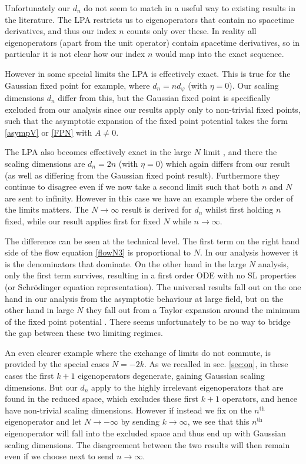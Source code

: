 \documentclass[11pt,a4paper]{article}
\numberwithin{figure}{section}
\numberwithin{equation}{section}
\newcommand{\ph}{\varphi}
\begin{document}
Unfortunately our $d_n$ do not seem to match in a useful way to existing results in the literature. The LPA restricts us to eigenoperators that contain no spacetime derivatives, and thus our index $n$ counts only over these. In reality all eigenoperators (apart from the unit operator) contain spacetime derivatives, so in particular it is not clear how our index $n$ would map into the exact sequence.

However in some special limits the LPA is effectively exact. This is true for the Gaussian fixed point for example, where $d_n = nd_\ph$ (with $\eta=0$). Our scaling dimensions $d_n$ differ from this, but the Gaussian fixed point is specifically excluded from our analysis since our results apply only to non-trivial fixed points, such that the asymptotic expansion of the fixed point potential takes the form \eqref{asympV} or \eqref{FPN} with $A\ne0$. 

The LPA also becomes effectively exact in the large $N$ limit \cite{DAttanasio:1997he}, and there the scaling dimensions are $d_n=2n$ (with $\eta=0$) which again differs from our result (as well as differing from the Gaussian fixed point result). Furthermore they continue to disagree even if we now take a second limit such that both $n$ and $N$ are sent to infinity. However in this case we have an example where the order of the limits matters. The $N\to\infty$ result is derived for $d_n$ whilst first holding $n$ fixed, while our result applies first for fixed $N$ while $n\to\infty$. 

The difference can be seen at the technical level. The first term on the right hand side of the flow equation \eqref{flowN3} is proportional to $N$. In our analysis however it is the denominators that dominate. On the other hand in the large $N$ analysis, only the first term survives, resulting in a first order ODE with no SL properties (or Schr\"odinger equation representation). The universal results fall out on the one hand in our analysis from the asymptotic behaviour at large field, but on the other hand in large $N$ they fall out from a Taylor expansion around the minimum of the fixed point potential \cite{DAttanasio:1997he}. There seems unfortunately to be no way to bridge the gap between these two limiting regimes.

An even clearer example where the exchange of limits do not commute, is provided by the special cases $N=-2k$. As we recalled in sec. \ref{sec:on}, in these cases the first $k+1$ eigenoperators degenerate, gaining Gaussian scaling dimensions. But our $d_n$ apply to the highly irrelevant eigenoperators that are found in the reduced space, which excludes these first $k+1$ operators, and hence have non-trivial scaling dimensions. However if instead we fix on the $n^\text{th}$ eigenoperator and let $N\to-\infty$ by sending $k\to\infty$, we see that this $n^\text{th}$ eigenoperator will fall into the excluded space and thus end up with Gaussian scaling dimensions. The disagreement between the two results will then remain even if we choose next to send $n\to\infty$.
\end{document}
